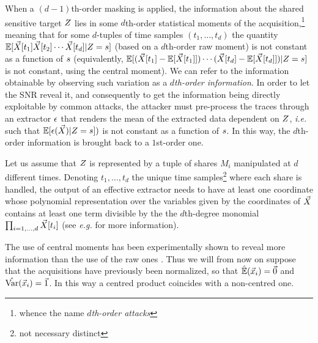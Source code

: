 When a $(d-1)$th-order masking is applied, the information about the shared sensitive target $Z$ lies in some $d$th-order statistical moments of the acquisition,\footnote{whence the name {\em $d$th-order attacks}} meaning that for some $d$-tuples of time samples $(t_1,\dots ,t_d)$ the quantity $\mathbb{E}[\vec{X}[t_1]\vec{X}[t_2]\cdots \vec{X}[t_d]\vert Z=s]$ (based on a $d$th-order raw moment) is not constant as a function of $s$ (equivalently, $ \mathbb{E}[(\vec{X}[t_1]-\mathbb{E}[\vec{X}[t_1]])\cdots (\vec{X}[t_d]-\mathbb{E}[\vec{X}[t_d]])\vert Z=s]$ is not constant, using the central moment). We can refer to the information obtainable by observing such variation as a {\em $d$th-order information}.
In order to let the SNR reveal it, and consequently to get the information being directly exploitable by common attacks, the attacker must pre-process the traces through an extractor $\epsilon$ that renders the mean of the extracted data dependent on $Z$, \emph{i.e.} such that $\mathbb{E}[\epsilon(\vec{X})\vert Z=s])$ is not constant as a function of $s$. In this way, the $d$th-order information is brought back to a $1$st-order one.

\begin{property}\label{property:poly}
Let us assume that $Z$ is represented by a tuple of shares $M_i$ manipulated at $d$ different times. Denoting $t_1,\dots,t_d$ the unique time samples\footnote{not necessary distinct} where each share is handled, the output of an effective extractor needs to have at least one coordinate whose polynomial representation over the variables given by the coordinates of $\vec{X}$ contains at least one term divisible by the the $d$th-degree monomial $\prod_{i=1,\dots,d}\vec{X}[t_i]$ (see \emph{e.g.} \cite{carlet2014achieving} for more information).
\end{property}


\begin{remark}\label{remark:normalized}
The use of central moments has been experimentally shown to reveal more information than the use of the raw ones \cite{chari1999towards,DBLP:journals/tc/ProuffRB09}. Thus we will from now on suppose that the acquisitions have previously been normalized, so that $\hat{\mathbb{E}}(\vec{x}_i) = \vec{0}$ and $\hat{\mathrm{Var}}(\vec{x}_i) = \vec{1}$. In this way a centred product coincides with a non-centred one. 
\end{remark}

